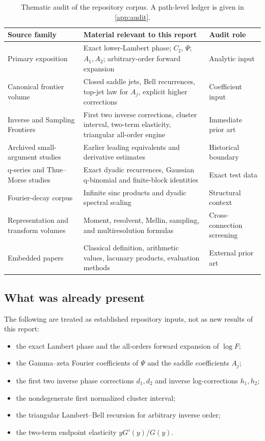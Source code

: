 \documentclass[11pt,oneside]{article}
\numberwithin{equation}{section}
\theoremstyle{definition}
\theoremstyle{remark}
\newcommand{\Csharp}{C_{\sharp}}
\begin{document}
\begin{table}[ht]
\centering
\small
\begin{tabularx}{\textwidth}{@{}p{}X p{}@{}}
\toprule
Source family & Material relevant to this report & Audit role \\
\midrule
Primary exposition & Exact lower-Lambert phase; $\Csharp$, $\Psi$; $A_1,A_2$; arbitrary-order forward expansion & Analytic input \\
Canonical frontier volume & Closed saddle jets, Bell recurrences, top-jet law for $A_j$, explicit higher corrections & Coefficient input \\
Inverse and Sampling Frontiers & First two inverse corrections, cluster interval, two-term elasticity, triangular all-order engine & Immediate prior art \\
Archived small-argument studies & Earlier leading equivalents and derivative estimates & Historical boundary \\
q-series and Thue--Morse studies & Exact dyadic recurrences, Gaussian q-binomial and finite-block identities & Exact test data \\
Fourier-decay corpus & Infinite sinc products and dyadic spectral scaling & Structural context \\
Representation and transform volumes & Moment, resolvent, Mellin, sampling, and multiresolution formulas & Cross-connection screening \\
Embedded papers & Classical definition, arithmetic values, lacunary products, evaluation methods & External prior art \\
\bottomrule
\end{tabularx}
\caption{Thematic audit of the repository corpus.  A path-level ledger is given in \cref{app:audit}.}
\label{tab:audit}
\end{table}

\subsection{What was already present}
The following are treated as established repository inputs, not as new results of this report:
\begin{itemize}
\item the exact Lambert phase and the all-orders forward expansion of $\log F$;
\item the Gamma--zeta Fourier coefficients of $\Psi$ and the saddle coefficients $A_j$;
\item the first two inverse phase corrections $d_1,d_2$ and inverse log-corrections $h_1,h_2$;
\item the nondegenerate first normalized cluster interval;
\item the triangular Lambert--Bell recursion for arbitrary inverse order;
\item the two-term endpoint elasticity $yG'(y)/G(y)$.
\end{itemize}
\end{document}
